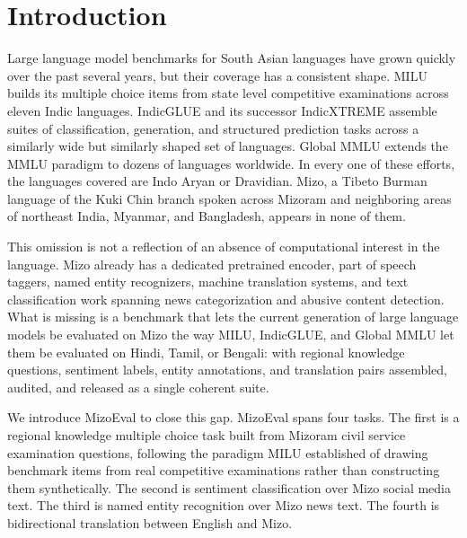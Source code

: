 \documentclass[pdflatex,sn-mathphys-ay]{sn-jnl}
\begin{document}

\maketitle

\section{Introduction}

Large language model benchmarks for South Asian languages have grown quickly over the past several years, but their coverage has a consistent shape. MILU builds its multiple choice items from state level competitive examinations across eleven Indic languages. IndicGLUE and its successor IndicXTREME assemble suites of classification, generation, and structured prediction tasks across a similarly wide but similarly shaped set of languages. Global MMLU extends the MMLU paradigm to dozens of languages worldwide. In every one of these efforts, the languages covered are Indo Aryan or Dravidian. Mizo, a Tibeto Burman language of the Kuki Chin branch spoken across Mizoram and neighboring areas of northeast India, Myanmar, and Bangladesh, appears in none of them.

This omission is not a reflection of an absence of computational interest in the language. Mizo already has a dedicated pretrained encoder, part of speech taggers, named entity recognizers, machine translation systems, and text classification work spanning news categorization and abusive content detection. What is missing is a benchmark that lets the current generation of large language models be evaluated on Mizo the way MILU, IndicGLUE, and Global MMLU let them be evaluated on Hindi, Tamil, or Bengali: with regional knowledge questions, sentiment labels, entity annotations, and translation pairs assembled, audited, and released as a single coherent suite.

We introduce MizoEval to close this gap. MizoEval spans four tasks. The first is a regional knowledge multiple choice task built from Mizoram civil service examination questions, following the paradigm MILU established of drawing benchmark items from real competitive examinations rather than constructing them synthetically. The second is sentiment classification over Mizo social media text. The third is named entity recognition over Mizo news text. The fourth is bidirectional translation between English and Mizo.
\end{document}
